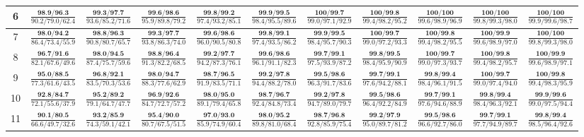 \documentclass{slides}
\begin{document}
{{{\begin{tabular}{|c|c|c|c|c|c|c|c|c|c|c|}
\hline
6 & $\frac{\textbf{98.9/96.3}}{90.2/79.0/62.4}$ & $\frac{\textbf{99.3/97.7}}{93.6/85.2/71.6}$ & $\frac{\textbf{99.6/98.6}}{95.9/89.8/79.2}$ & $\frac{\textbf{99.8/99.2}}{97.4/93.2/85.1}$ & $\frac{\textbf{99.9/99.5}}{98.4/95.5/89.6}$ & $\frac{\textbf{100/99.7}}{99.0/97.1/92.9}$ & $\frac{\textbf{100/99.8}}{99.4/98.2/95.2}$ & $\frac{\textbf{100/100}}{99.6/98.9/96.9}$ & $\frac{\textbf{100/100}}{99.8/99.3/98.0}$ & $\frac{\textbf{100/100}}{99.9/99.6/98.7}$ \\
\hline
7 & $\frac{\textbf{98.0/94.2}}{86.4/73.4/55.9}$ & $\frac{\textbf{98.8/96.3}}{90.8/80.7/65.7}$ & $\frac{\textbf{99.3/97.7}}{93.8/86.3/74.0}$ & $\frac{\textbf{99.6/98.6}}{96.0/90.5/80.8}$ & $\frac{\textbf{99.8/99.1}}{97.4/93.5/86.2}$ & $\frac{\textbf{99.9/99.5}}{98.4/95.7/90.3}$ & $\frac{\textbf{100/99.7}}{99.0/97.2/93.3}$ & $\frac{\textbf{100/99.8}}{99.4/98.2/95.5}$ & $\frac{\textbf{100/99.9}}{99.6/98.9/97.0}$ & $\frac{\textbf{100/100}}{99.8/99.3/98.0}$ \\
\hline
8 & $\frac{\textbf{96.7/91.6}}{82.1/67.6/49.6}$ & $\frac{\textbf{98.0/94.5}}{87.4/75.7/59.6}$ & $\frac{\textbf{98.8/96.4}}{91.3/82.2/68.5}$ & $\frac{\textbf{99.2/97.7}}{94.2/87.3/76.1}$ & $\frac{\textbf{99.6/98.6}}{96.1/91.1/82.3}$ & $\frac{\textbf{99.7/99.1}}{97.5/93.9/87.2}$ & $\frac{\textbf{99.8/99.5}}{98.4/95.9/90.9}$ & $\frac{\textbf{100/99.7}}{99.0/97.3/93.7}$ & $\frac{\textbf{100/99.8}}{99.4/98.2/95.7}$ & $\frac{\textbf{100/99.9}}{99.6/98.9/97.1}$ \\
\hline
9 & $\frac{\textbf{95.0/88.5}}{77.3/61.6/43.5}$ & $\frac{\textbf{96.8/92.1}}{83.5/70.3/53.6}$ & $\frac{\textbf{98.0/94.7}}{88.3/77.6/62.9}$ & $\frac{\textbf{98.7/96.5}}{91.9/83.5/71.1}$ & $\frac{\textbf{99.2/97.8}}{94.4/88.2/78.0}$ & $\frac{\textbf{99.5/98.6}}{96.3/91.7/83.6}$ & $\frac{\textbf{99.7/99.1}}{97.6/94.2/88.1}$ & $\frac{\textbf{99.8/99.4}}{98.4/96.1/91.5}$ & $\frac{\textbf{100/99.7}}{99.0/97.4/94.0}$ & $\frac{\textbf{100/99.8}}{99.4/98.3/95.9}$ \\
\hline
10 & $\frac{\textbf{92.8/84.7}}{72.1/55.6/37.9}$ & $\frac{\textbf{95.2/89.2}}{79.1/64.7/47.7}$ & $\frac{\textbf{96.9/92.6}}{84.7/72.7/57.2}$ & $\frac{\textbf{98.0/95.0}}{89.1/79.4/65.8}$ & $\frac{\textbf{98.7/96.7}}{92.4/84.8/73.4}$ & $\frac{\textbf{99.2/97.8}}{94.7/89.0/79.7}$ & $\frac{\textbf{99.5/98.6}}{96.4/92.2/84.9}$ & $\frac{\textbf{99.7/99.1}}{97.6/94.6/88.9}$ & $\frac{\textbf{99.8/99.4}}{98.4/96.3/92.1}$ & $\frac{\textbf{99.9/99.6}}{99.0/97.5/94.4}$ \\
\hline
11 & $\frac{\textbf{90.1/80.5}}{66.6/49.7/32.6}$ & $\frac{\textbf{93.2/85.9}}{74.3/59.1/42.1}$ & $\frac{\textbf{95.4/90.0}}{80.7/67.5/51.5}$ & $\frac{\textbf{97.0/93.0}}{85.9/74.9/60.4}$ & $\frac{\textbf{98.0/95.2}}{89.8/81.0/68.4}$ & $\frac{\textbf{98.7/96.8}}{92.8/85.9/75.4}$ & $\frac{\textbf{99.2/97.9}}{95.0/89.7/81.2}$ & $\frac{\textbf{99.5/98.6}}{96.6/92.7/86.0}$ & $\frac{\textbf{99.7/99.1}}{97.7/94.9/89.7}$ & $\frac{\textbf{99.8/99.4}}{98.5/96.4/92.6}$ \\

\end{tabular}}}}
\end{document}
